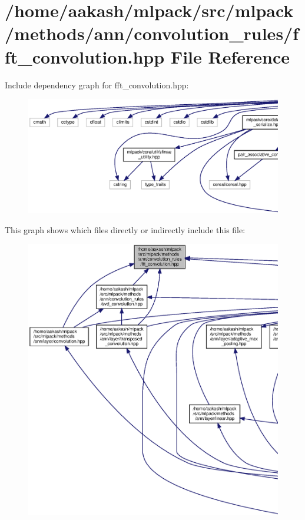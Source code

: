 \section{/home/aakash/mlpack/src/mlpack/methods/ann/convolution\+\_\+rules/fft\+\_\+convolution.hpp File Reference}
\label{fft__convolution_8hpp}
Include dependency graph for fft\+\_\+convolution.\+hpp\+:
\nopagebreak
\begin{figure}[H]
\begin{center}
\leavevmode
\includegraphics[width=350pt]{fft__convolution_8hpp__incl}
\end{center}
\end{figure}
This graph shows which files directly or indirectly include this file\+:
\nopagebreak
\begin{figure}[H]
\begin{center}
\leavevmode
\includegraphics[width=350pt]{fft__convolution_8hpp__dep__incl}
\end{center}
\end{figure}
